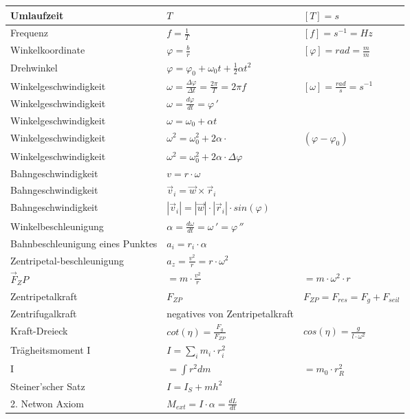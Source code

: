\begin{tabularx}{\columnwidth}{@{}XXX@{}}
	Umlaufzeit & $T$ & $[T] = s$ \\ \hline
	Frequenz & $f=\frac{1}{T}$ & $[f] = s^{-1} = Hz$ \\ \hline
	Winkelkoordinate & $\varphi = \frac{b}{r}$ & $[\varphi] = rad = \frac{m}{m}$ \\ \hline
	Drehwinkel & $\varphi = \varphi_0 + \omega_0 t + \frac{1}{2}\alpha t^2$ \\ \hline
	Winkelgeschwindigkeit & $\omega = \frac{\Delta \varphi}{\Delta t} = \frac{2\pi}{T} = 2\pi f$ & $[\omega] = \frac{rad}{s} = s^{-1}$ \\ \hline
	Winkelgeschwindigkeit & $\omega = \frac{d\varphi}{dt} = \varphi\,'$ \\ \hline
	Winkelgeschwindigkeit & $\omega = \omega_0 + \alpha t$ \\ \hline
	Winkelgeschwindigkeit & $\omega^2 = \omega_0^2 + 2\alpha\cdot $ & $\left(\varphi-\varphi_{0}\right)$ \\ \hline
	Winkelgeschwindigkeit & $\omega^2 = \omega_0^2 + 2\alpha\cdot\Delta \varphi$ \\ \hline
	Bahngeschwindigkeit & $v = r\cdot \omega$ \\ \hline
	Bahngeschwindigkeit & $\vec{v}_i = \vec{w} \times \vec{r}_i$ \\ \hline
	Bahngeschwindigkeit & $|\vec{v}_i| = |\vec{w}| \cdot |\vec{r}_i| \cdot sin(\varphi)$ \\ \hline
	Winkelbeschleunigung & $ \alpha = \frac{d\omega}{dt} = \omega\,' = \varphi\,''$ \\ \hline
	Bahnbeschleunigung eines Punktes & $a_i = r_i\cdot \alpha$ \\ \hline
	Zentripetal-beschleunigung & $a_z = \frac{v^2}{r} = r\cdot \omega^2$ \\ \hline
	$\vec{F}_ZP$ & $= m\cdot \frac{v^2}{r}$ & $= m\cdot \omega^2\cdot r$ \\ \hline
	Zentripetalkraft & $F_{ZP}$ & $F_{ZP} = F_{res} = F_g + F_{seil}$ \\\hline
	Zentrifugalkraft & negatives von Zentripetalkraft \\ \hline
	Kraft-Dreieck & $cot(\eta) = \frac{F_g}{F_{ZP}}$ & $cos(\eta) = \frac{g}{l\cdot\omega^2}$ \\ \hline
	Trägheitsmoment I & $I = \sum_{i} m_i\cdot r_i^2$ \\ \hline  
	I & $= \int r^2dm$ & $= m_0\cdot r_R^2$ \\ \hline
	Steiner'scher Satz & $I = I_S + mh^2$ \\ \hline
	2. Netwon Axiom & $M_{ext} = I \cdot \alpha = \frac{dL}{dt}$ \\ \hline
\end{tabularx}
